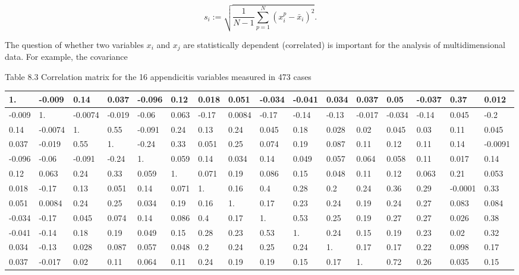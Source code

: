 \documentclass[10pt]{article}
\begin{document}
$$
s_{i}:=\sqrt{\frac{1}{N-1} \sum_{p=1}^{N}\left(x_{i}^{p}-\bar{x}_{i}\right)^{2}} .
$$

The question of whether two variables $x_{i}$ and $x_{j}$ are statistically dependent (correlated) is important for the analysis of multidimensional data. For example, the covariance

Table 8.3 Correlation matrix for the 16 appendicitis variables measured in 473 cases

\begin{center}
\begin{tabular}{|l|l|l|l|l|l|l|l|l|l|l|l|l|l|l|l|}
\hline
1. & -0.009 & 0.14 & 0.037 & -0.096 & 0.12 & 0.018 & 0.051 & -0.034 & -0.041 & 0.034 & 0.037 & 0.05 & -0.037 & 0.37 & 0.012 \\
\hline
-0.009 & 1. & -0.0074 & -0.019 & -0.06 & 0.063 & -0.17 & 0.0084 & -0.17 & -0.14 & -0.13 & -0.017 & -0.034 & -0.14 & 0.045 & -0.2 \\
\hline
0.14 & -0.0074 & 1. & 0.55 & -0.091 & 0.24 & 0.13 & 0.24 & 0.045 & 0.18 & 0.028 & 0.02 & 0.045 & 0.03 & 0.11 & 0.045 \\
\hline
0.037 & -0.019 & 0.55 & 1. & -0.24 & 0.33 & 0.051 & 0.25 & 0.074 & 0.19 & 0.087 & 0.11 & 0.12 & 0.11 & 0.14 & -0.0091 \\
\hline
-0.096 & -0.06 & -0.091 & -0.24 & 1. & 0.059 & 0.14 & 0.034 & 0.14 & 0.049 & 0.057 & 0.064 & 0.058 & 0.11 & 0.017 & 0.14 \\
\hline
0.12 & 0.063 & 0.24 & 0.33 & 0.059 & 1. & 0.071 & 0.19 & 0.086 & 0.15 & 0.048 & 0.11 & 0.12 & 0.063 & 0.21 & 0.053 \\
\hline
0.018 & -0.17 & 0.13 & 0.051 & 0.14 & 0.071 & 1. & 0.16 & 0.4 & 0.28 & 0.2 & 0.24 & 0.36 & 0.29 & -0.0001 & 0.33 \\
\hline
0.051 & 0.0084 & 0.24 & 0.25 & 0.034 & 0.19 & 0.16 & 1. & 0.17 & 0.23 & 0.24 & 0.19 & 0.24 & 0.27 & 0.083 & 0.084 \\
\hline
-0.034 & -0.17 & 0.045 & 0.074 & 0.14 & 0.086 & 0.4 & 0.17 & 1. & 0.53 & 0.25 & 0.19 & 0.27 & 0.27 & 0.026 & 0.38 \\
\hline
-0.041 & -0.14 & 0.18 & 0.19 & 0.049 & 0.15 & 0.28 & 0.23 & 0.53 & 1. & 0.24 & 0.15 & 0.19 & 0.23 & 0.02 & 0.32 \\
\hline
0.034 & -0.13 & 0.028 & 0.087 & 0.057 & 0.048 & 0.2 & 0.24 & 0.25 & 0.24 & 1. & 0.17 & 0.17 & 0.22 & 0.098 & 0.17 \\
\hline
0.037 & -0.017 & 0.02 & 0.11 & 0.064 & 0.11 & 0.24 & 0.19 & 0.19 & 0.15 & 0.17 & 1. & 0.72 & 0.26 & 0.035 & 0.15 \\

\end{tabular}
\end{center}
\end{document}
